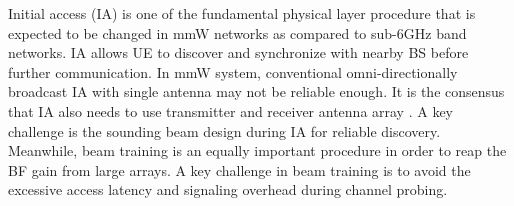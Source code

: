 \documentclass[journal]{IEEEtran}
\begin{document}
Initial access (IA) is one of the fundamental physical layer procedure that is expected to be changed in mmW networks as compared to sub-6GHz band networks. IA allows UE to discover and synchronize with nearby BS before further communication. 
In mmW system, conventional omni-directionally broadcast IA with single antenna may not be reliable enough. It is the consensus that IA also needs to use transmitter and receiver antenna array \cite{7161389,Giordani_beam_turotial_arxiv_1804}. A key challenge is the sounding beam design during IA for reliable discovery.
Meanwhile, beam training is an equally important procedure in order to reap the BF gain from large arrays. A key challenge in beam training is to avoid the excessive access latency and signaling overhead during channel probing. 



\end{document}
